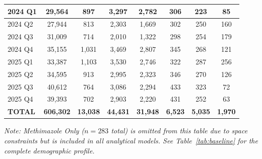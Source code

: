\documentclass[10pt,twocolumn]{article}
\begin{document}
\begin{table}[!t]
\begin{tabular}{|l|c|c|c|c|c|c|c|}
\rowcolor{rowA} 2024 Q1 & 29,564 & 897 & 3,297 & 2,782 & 306 & 223 & 85\\
\hline
\rowcolor{rowB} 2024 Q2 & 27,944 & 813 & 2,303 & 1,669 & 302 & 250 & 160\\
\hline
\rowcolor{rowA} 2024 Q3 & 31,009 & 714 & 2,010 & 1,322 & 298 & 254 & 179\\
\hline
\rowcolor{rowB} 2024 Q4 & 35,155 & 1,031 & 3,469 & 2,807 & 345 & 268 & 121\\
\hline
\rowcolor{rowA} 2025 Q1 & 33,387 & 1,103 & 3,530 & 2,746 & 322 & 287 & 256\\
\hline
\rowcolor{rowB} 2025 Q2 & 34,595 & 913 & 2,995 & 2,323 & 346 & 270 & 126\\
\hline
\rowcolor{rowA} 2025 Q3 & 40,612 & 764 & 3,086 & 2,294 & 433 & 323 & 72\\
\hline
\rowcolor{rowB} 2025 Q4 & 39,393 & 702 & 2,903 & 2,220 & 431 & 252 & 63\\
\hline
\rowcolor{jpbiLight}
\textbf{TOTAL} & \textbf{606,302} & \textbf{13,038} & \textbf{44,431} & \textbf{31,948} & \textbf{6,523} & \textbf{5,035} & \textbf{1,970}\\
\hline
\end{tabular}
 
\smallskip
\noindent\footnotesize\textit{Note: Methimazole Only ($n = 283$ total) is omitted from this table due to space constraints but is included in all analytical models. See Table~\ref{tab:baseline} for the complete demographic profile.}
\end{table}
 
\end{document}
